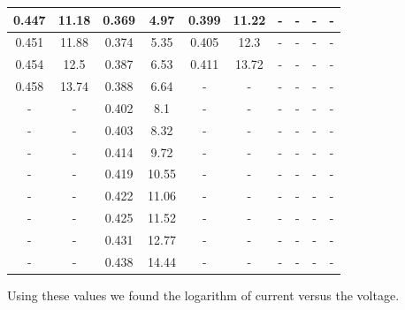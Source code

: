 \documentclass[12pt]{article}
\begin{document}
\begin{center}
\begin{tabular}{|| c c | c c | c c | c c | c c ||}
0.447 & 11.18 & 0.369 & 4.97 & 0.399 & 11.22 & - & - & - & - \\ \hline 
0.451 & 11.88 & 0.374 & 5.35 & 0.405 & 12.3 & - & - & - & - \\ \hline 
0.454 & 12.5 & 0.387 & 6.53 & 0.411 & 13.72 & - & - & - & - \\ \hline 
0.458 & 13.74 & 0.388 & 6.64 & - & - & - & - & - & - \\ \hline 
- & - & 0.402 & 8.1 & - & - & - & - & - & - \\ \hline 
- & - & 0.403 & 8.32 & - & - & - & - & - & - \\ \hline 
- & - & 0.414 & 9.72 & - & - & - & - & - & - \\ \hline 
- & - & 0.419 & 10.55 & - & - & - & - & - & - \\ \hline 
- & - & 0.422 & 11.06 & - & - & - & - & - & - \\ \hline 
- & - & 0.425 & 11.52 & - & - & - & - & - & - \\ \hline 
- & - & 0.431 & 12.77 & - & - & - & - & - & - \\ \hline 
- & - & 0.438 & 14.44 & - & - & - & - & - & - \\ \hline 
\end{tabular}
\end{center}

Using these values we found the logarithm of current versus the voltage.
\end{document}
